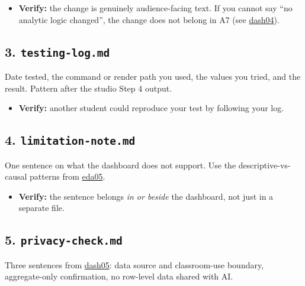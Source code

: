 \documentclass[
  letterpaper,
  DIV=11,
  numbers=noendperiod,
  oneside]{scrreprt}
\providecommand{\tightlist}{%
  \setlength{\itemsep}{0pt}\setlength{\parskip}{0pt}}
\begin{document}
\begin{itemize}
\tightlist
\item
  \textbf{Verify:} the change is genuinely audience-facing text. If you
  cannot say ``no analytic logic changed'', the change does not belong
  in A7 (see
  \hyperref[audience-facing-text-what-you-can-and-cannot-change-for-a7]{dash04}).
\end{itemize}

\subsection*{\texorpdfstring{3.
\texttt{testing-log.md}}{3. testing-log.md}}\label{testing-log.md}

Date tested, the command or render path you used, the values you tried,
and the result. Pattern after the studio Step 4 output.

\begin{itemize}
\tightlist
\item
  \textbf{Verify:} another student could reproduce your test by
  following your log.
\end{itemize}

\subsection*{\texorpdfstring{4.
\texttt{limitation-note.md}}{4. limitation-note.md}}\label{limitation-note.md}

One sentence on what the dashboard does not support. Use the
descriptive-vs-causal patterns from
\hyperref[four-audit-categories-for-ai-drafted-eda]{eda05}.

\begin{itemize}
\tightlist
\item
  \textbf{Verify:} the sentence belongs \emph{in or beside} the
  dashboard, not just in a separate file.
\end{itemize}

\subsection*{\texorpdfstring{5.
\texttt{privacy-check.md}}{5. privacy-check.md}}\label{privacy-check.md}

Three sentences from
\hyperref[testing-privacy-safe-publishing-and-the-shiny-demo]{dash05}:
data source and classroom-use boundary, aggregate-only confirmation, no
row-level data shared with AI.
\end{document}

